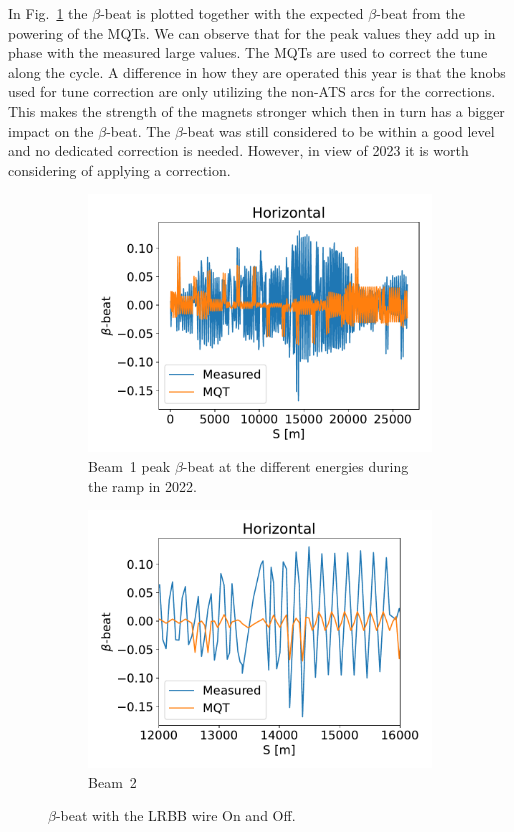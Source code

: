 \documentclass{cernatsnote}
\begin{document}
In Fig.~\ref{fig:ramp_mqt} the $\beta$-beat is plotted together with the expected $\beta$-beat from the powering of the MQTs. We can observe that for the peak values they add up in phase with the measured large values. The MQTs are used to correct the tune along the cycle. A difference in how they are operated this year is that the knobs used for tune correction are only utilizing the non-ATS arcs for the corrections. This makes the strength of the magnets stronger which then in turn has a bigger impact on the $\beta$-beat. The $\beta$-beat was still considered to be within a good level and no dedicated correction is needed. However, in view of 2023 it is worth considering of applying a correction.

\begin{figure}[ht]
\begin{subfigure}{.5\textwidth}
  \centering
  \includegraphics[width=.8\linewidth]{ramp/mqt_in_ramp_1900GeV_horizontal.pdf}  
  \caption{Beam~1 peak $\beta$-beat at the different energies during the ramp in 2022.}
\end{subfigure}
\begin{subfigure}{.5\textwidth}
  \centering
  \includegraphics[width=.8\linewidth]{ramp/mqt_in_ramp_1900GeV_horizontal_zoom.pdf}  
  \caption{Beam~2}
\end{subfigure}
\caption{$\beta$-beat with the LRBB wire On and Off.}
\label{fig:ramp_mqt}
\end{figure}
\end{document}

